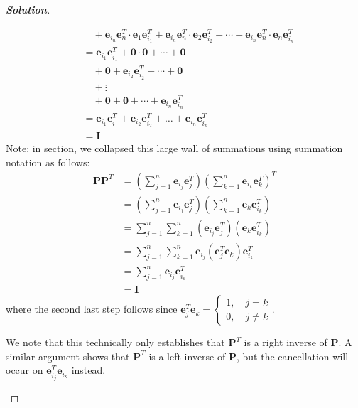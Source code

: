 \documentclass[11pt]{article}
\renewcommand{\vec}[1]{\mathbf{#1}}
\newenvironment{solution}{%
  \begin{proof}[\textbf{Solution}]$ $\par\nobreak\ignorespaces
}{%
  \end{proof}
}
\theoremstyle{definition}
\begin{document}
\begin{solution}
\begin{enumerate}[(a)]
\begin{align*}
        &\quad + \vec{e}_{i_n}\vec{e}_{n}^T \cdot \vec{e}_{1}\vec{e}_{i_1}^T + \vec{e}_{i_n}\vec{e}_{n}^T \cdot \vec{e}_{2}\vec{e}_{i_2}^T + \cdots + \vec{e}_{i_n}\vec{e}_{n}^T \cdot \vec{e}_{n}\vec{e}_{i_n}^T \\
        &= \vec{e}_{i_1}\vec{e}_{i_1}^T + \vec{0} \cdot \vec{0} + \cdots + \vec{0} \\
        &\quad + \vec{0} + \vec{e}_{i_2}\vec{e}_{i_2}^T + \cdots + \vec{0} \\
        &\quad + \vdots \\
        &\quad + \vec{0} + \vec{0} + \cdots + \vec{e}_{i_n}\vec{e}_{i_n}^T \\
        &= \vec{e}_{i_1}\vec{e}_{i_1}^{T} + \vec{e}_{i_2}\vec{e}_{i_2}^{T} + \ldots + \vec{e}_{i_n}\vec{e}_{i_n}^{T} \\
        &= \vec{I}
    \end{align*}
    Note: in section, we collapsed this large wall of summations using summation notation as follows:
    \begin{align*}
        \vec{P}\vec{P}^T &= \left(\sum_{j = 1}^{n} \vec{e}_{i_j}\vec{e}_j^T \right)\left(\sum_{k = 1}^{n} \vec{e}_{i_k}\vec{e}_k^T \right)^T \\
        &= \left(\sum_{j = 1}^{n} \vec{e}_{i_j}\vec{e}_j^T \right) \left(\sum_{k = 1}^{n} \vec{e}_{k}\vec{e}_{i_k}^T \right) \\
        &= \sum_{j = 1}^{n} \sum_{k = 1}^{n} (\vec{e}_{i_j}\vec{e}_j^{T})(\vec{e}_k\vec{e}_{i_k}^T) \\
        &= \sum_{j = 1}^{n} \sum_{k = 1}^{n} \vec{e}_{i_j}(\vec{e}_j^{T}\vec{e}_k)\vec{e}_{i_k}^T \\
        &= \sum_{j = 1}^{n} \vec{e}_{i_j}\vec{e}_{i_k}^T \\
        &= \vec{I}
    \end{align*}
    where the second last step follows since $\vec{e}_j^{T}\vec{e}_k = \begin{cases}1,\quad j = k\\0,\quad j \neq k\end{cases}$.

    We note that this technically only establishes that $\vec{P}^T$ is a right inverse of $\vec{P}$. A similar argument shows that $\vec{P}^T$ is a left inverse of $\vec{P}$, but the cancellation will occur on $\vec{e}_{i_j}^T\vec{e}_{i_k}$ instead.
\end{enumerate}
\end{solution}
\end{document}
